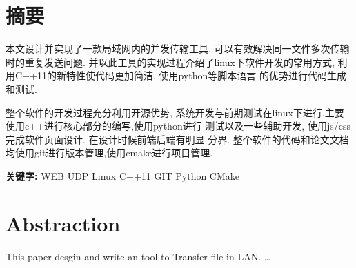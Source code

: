 \chapter*{摘要}

本文设计并实现了一款局域网内的并发传输工具,
可以有效解决同一文件多次传输时的重复发送问题.
并以此工具的实现过程介绍了linux下软件开发的常用方式,
利用C++11的新特性使代码更加简洁, 使用python等脚本语言
的优势进行代码生成和测试. 

整个软件的开发过程充分利用开源优势,
系统开发与前期测试在linux下进行,主要使用c++进行核心部分的编写,使用python进行
测试以及一些辅助开发, 使用js/css完成软件页面设计. 在设计时候前端后端有明显
分界. 整个软件的代码和论文文档均使用git进行版本管理,使用cmake进行项目管理.

\noindent\textbf{关键字:} WEB UDP Linux C++11 GIT Python CMake

\chapter*{Abstraction}
This paper desgin and write an tool to Transfer file in LAN.
\ldots
